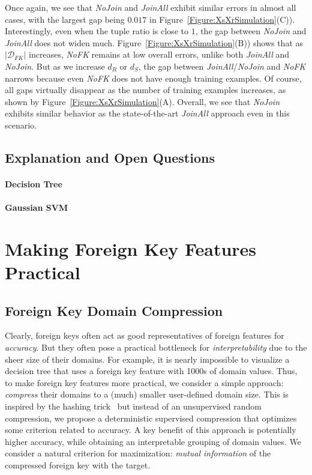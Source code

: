 \documentclass[sigconf]{acmart}
\begin{document}
Once again, we see that \textit{NoJoin} and \textit{JoinAll} exhibit similar errors in almost all cases, with the largest gap being $0.017$ in Figure~\ref{Figure:XsXrSimulation}(C)).
Interestingly, even when the tuple ratio is close to $1$, the gap between \textit{NoJoin} and \textit{JoinAll} does not widen much. 
Figure~\ref{Figure:XsXrSimulation}(B)) shows that as $|\mathcal{D}_{FK}|$ increases, \textit{NoFK} remains at low overall errors, unlike both \textit{JoinAll} and \textit{NoJoin}.
But as we increase $d_R$ or $d_S$, the gap between \textit{JoinAll}/\textit{NoJoin} and \textit{NoFK} narrows because even \textit{NoFK} does not have enough training examples.
Of course, all gaps virtually disappear as the number of training examples increases, as shown by Figure~\ref{Figure:XsXrSimulation}(A).
Overall, we see that \textit{NoJoin} exhibits similar behavior as the state-of-the-art \textit{JoinAll} approach even in this scenario.


\subsection{Explanation and Open Questions}

\paragraph*{Decision Tree}

\paragraph*{Gaussian SVM}


\section{Making Foreign Key Features Practical}

\subsection{Foreign Key Domain Compression}

Clearly, foreign keys often act as good representatives of foreign features for \textit{accuracy}.
But they often pose a practical bottleneck for \textit{interpretability} due to the sheer size of their domains.
For example, it is nearly impossible to visualize a decision tree that uses a foreign key feature with 1000s of domain values.
Thus, to make foreign key features more practical, we consider a simple approach: \textit{compress} their domains to a (much) smaller 
user-defined domain size. This is inspired by the hashing trick~\cite{hashingtrick} but instead of an unsupervised random 
compression, we propose a deterministic supervised compression that optimizes some criterion related to accuracy. A key benefit of 
this approach is potentially higher accuracy, while obtaining an interpretable grouping of domain values.
We consider a natural criterion for maximization: \textit{mutual information} of the compressed foreign key with the target.
\end{document}

